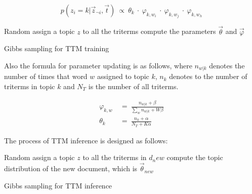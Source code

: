 \begin{equation}
     p(z_i=k|\vec z_{\lnot i},\vec t)\ \propto\ \theta_k\ \cdot\ \varphi_{k, w_i}\ \cdot\ \varphi_{k,w_j}\ \cdot\ \varphi_{k,w_h}
\end{equation}

\begin{algorithm}[H]
  \SetAlgoLined
  \KwOut{$\vec\theta$, $\vec\varphi$}
  Random assign a topic $z$ to all the triterms\;
  compute the parameters $\vec\theta$ and $\vec\varphi$\;
  \caption{Gibbs sampling for TTM training}
\end{algorithm}


Also the formula for parameter updating is as follows, where $n_{w|k}$ denotes the number of times that word $w$ assigned to topic $k$, $n_k$ denotes to the number of triterms in topic $k$ and $N_T$ is the number of all triterms.

\begin{equation}
\begin{aligned}
    \varphi_{k,w}\ &=\ \frac{n_{w|k}+\beta}{\sum_{w} n_{w|k}+W\beta}\\
    \theta_k\ &=\ \frac{n_k+\alpha}{N_T+K\alpha}
\end{aligned}
\end{equation}

The process of TTM inference is designed as follows:

\begin{algorithm}[H]
  \SetAlgoLined
  Random assign a topic $z$ to all the triterms in $d_new$\;
  compute the topic distribution of the new document, which is $\vec\theta_{new}$\;
  \caption{Gibbs sampling for TTM inference}
\end{algorithm}
